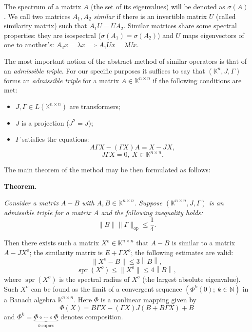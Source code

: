 \documentclass[a4paper]{jpconf}
\begin{document}
The spectrum of a matrix \( A \)
    (the set of its eigenvalues)
    will be denoted as \( \sigma(A) \).
We call two matrices \( A_1, A_2 \) \emph{similar}
    if there is an invertible matrix \( U \)
    (called similarity matrix)
    such that \( A_1 U = U A_2 \).
Similar matrices share some spectral properties:
    they are isospectral (\( \sigma(A_1) = \sigma(A_2) \))
    and \( U \) maps eigenvectors of one to another's:
    \( A_2 x = \lambda x \implies A_1 U x = \lambda U x \).

The most important notion
    of the abstract method of similar operators
    is that of an \emph{admissible triple}.
For our specific purposes it suffices to say
    that \( (\mathbb{K}^n, J, \Gamma) \)
    forms an \emph{admissible triple}
    for a matrix \( A\in\mathbb{K}^{n{\times}n} \)
    if the following conditions are met:
\begin{itemize}
    \item \( J, \Gamma \in L(\mathbb{K}^{n{\times}n}) \)
        are transformers;
    \item \( J \) is a projection (\( J^2 = J \));
    \item  \( \Gamma \) satisfies the equations:
        \[
            A \Gamma X - (\Gamma X) A = X - JX,
        \]
        \[
            J\Gamma X = 0,\ X\in\mathbb{K}^{n{\times}n}.
        \]
\end{itemize}

The main theorem of the method
    may be then formulated as follows:

\textbf{Theorem.}
{\it
    Consider a matrix \( A - B \)
        with \( A, B \in \mathbb{K}^{n{\times}n} \).
    Suppose \( (\mathbb{K}^{n{\times}n}, J, \Gamma) \)
        is an admissible triple for a matrix \( A \)
        and the following inequality holds:
        \[
            \|B\|\|\Gamma\|_{\mathrm{op}} \leq \frac14.
        \]

    Then there exists such a matrix \( X^o\in\mathbb{K}^{n{\times}n} \)
        that
        \( A - B \) is similar to a matrix \( A - J X^o \);
        the similarity matrix is \( E + \Gamma X^o \);
        the following estimates are valid:
        \[
            \|X^o - B\| \leq 3 \left\|B\right\|,
        \]
        \[
            \operatorname{spr}(X^o) \leq \|X^o\| \leq 4 \left\|B\right\|,
        \]
        where \( \operatorname{spr}(X^o) \)
        is the spectral radius of \( X^o \) (the largest absolute eigenvalue).
    Such \( X^o \) can be found as the limit of a convergent sequence
        \( \left( \Phi^k(0);\ k\in\mathbb{N} \right) \)
        in a Banach algebra \( \mathbb{K}^{n{\times}n} \).
        Here \( \Phi \) is a nonlinear mapping given by
    \[
        \Phi(X) = B\Gamma X - (\Gamma X)J(B + B\Gamma X) + B
    \]
        and \( \Phi^k = \underbrace{\Phi\circ\cdots\circ\Phi}_{k\ \text{copies}} \)
        denotes composition.
}
\end{document}
